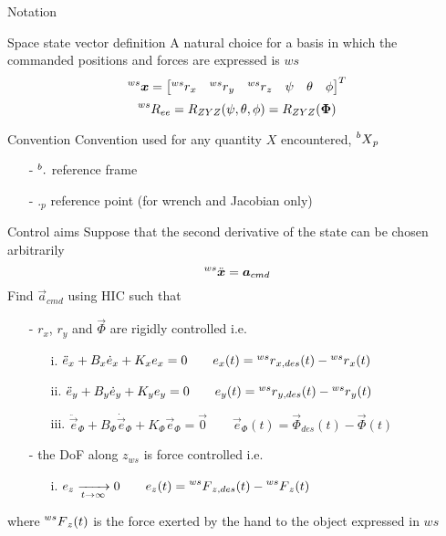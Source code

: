 \begin{frame}{Notation}
  \begin{block}{Space state vector definition}
    A natural choice for a basis in which the commanded positions and forces are \alert{expressed is $ws$}
    \[
    \prescript{ws}{}{\vec{x}} = 
    \begin{bmatrix}
      \prescript{ws}{}{r}_x & \prescript{ws}{}{r}_y & \prescript{ws}{}{r}_z & \psi & \theta & \phi
    \end{bmatrix}^T
    \]
    \[
    \prescript{ws}{}{R}_{ee} = R_{ZYZ}(\psi, \theta, \phi) = R_{ZYZ}(\vec{\Phi})
    \]
  \end{block}
  \begin{block}{Convention}
    Convention used for any quantity $X$ encountered, $\prescript{b}{}{X}_p$
    \begin{itemize}
      \item[-] $\prescript{b}{}{.}$ reference frame
      \item[-] $._p$ reference point (for wrench and Jacobian only)
    \end{itemize}
  \end{block}
\end{frame}

\begin{frame}{Control aims}
  \alert{Suppose} that the second derivative of the state can be chosen arbitrarily
  \[
  \prescript{ws}{}{\ddot{\vec{x}}} = \vec{a}_{cmd}
  \]
  Find $\vec{a}_{cmd}$ using HIC such that
  \begin{itemize}
  \item[-]$r_x$, $r_y$ and $\vec{\Phi}$ are rigidly controlled i.e.
    \begin{itemize}
    \item[i.] $\ddot{e}_{x} + B_x \dot{e}_x + K_x e_x = 0 \quad \quad  e_x(t) =   \prescript{ws}{} r_{x,des}(t) - \prescript{ws}{} r_{x}(t)$
    \item[ii.] $\ddot{e}_{y} + B_y \dot{e}_y + K_y e_y = 0 \quad \quad e_y(t) =   \prescript{ws}{} r_{y,des}(t) - \prescript{ws}{} r_{y}(t)$
    \item[iii.] $\ddot{\vec{e}}_{\Phi} + B_{\Phi} \dot{\vec{e}}_{\Phi} + K_{\Phi} \vec{e}_{\Phi} = \vec{0} \quad \quad \vec{e}_{\Phi}(t) = \vec{\Phi}_{des}(t) - \vec{\Phi}(t)$
    \end{itemize}
  \item[-]the DoF along $z_{ws}$ is force controlled i.e.
    \begin{itemize}
    \item[i.] $e_z \xrightarrow[t \to \infty] {} 0 \quad \quad e_{z}(t) = \prescript{ws}{} F_{z,des}(t) - \prescript{ws}{} F_{z}(t)$
    \end{itemize}
  \end{itemize}
  where $\prescript{ws}{} F_{z}(t)$ is the force exerted by the hand to the object expressed in $ws$
\end{frame}

